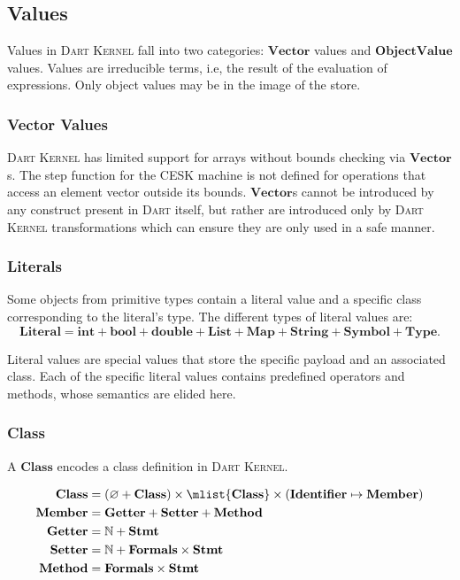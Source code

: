 \documentclass[a4paper,oneside,fleqn]{article}
\newcommand{\kernel}{\textsc{Dart Kernel}}
\newcommand{\dart}{\textsc{Dart}}
\renewcommand{\emptyset}{\varnothing}
\newcommand{\NN}{\mathbb{N}}    %
\newcommand{\dstmt}{\mathbf{Stmt}}
\newcommand{\dlit}{\mathbf{Literal}}
\newcommand{\dobjval}{\mathbf{ObjectValue}}
\newcommand{\dvector}{\mathbf{Vector}}
\newcommand{\dmember}{\mathbf{Member}}
\newcommand{\dident}{\mathbf{Identifier}}
\newcommand{\dtype}{\mathbf{Type}}
\newcommand{\dclass}{\mathbf{Class}}
\newcommand{\dformals}{\mathbf{Formals}}
\newcommand{\dsemint}{\mathbf{int}}
\newcommand{\dsembool}{\mathbf{bool}}
\newcommand{\dsemdouble}{\mathbf{double}}
\newcommand{\dsemlist}{\mathbf{List}}
\newcommand{\dsemmap}{\mathbf{Map}}
\newcommand{\dsemstring}{\mathbf{String}}
\newcommand{\dsemsymbol}{\mathbf{Symbol}}
\begin{document}
\subsection{Values}
\label{sec:values}

Values in \kernel{} fall into two categories: $\dvector$ values and $\dobjval$ values.
Values are irreducible terms, i.e, the result of the evaluation of expressions.
Only object values may be in the image of the store.

\subsubsection{Vector Values}
\label{subsubsec:vector-values}

\kernel{} has limited support for arrays without bounds checking via $\dvector$s.
The step function for the CESK machine is not defined for operations that access an element vector outside its bounds.
$\dvector$s cannot be introduced by any construct present in \dart{} itself, but rather are introduced only by \kernel{} transformations which can ensure they are only used in a safe manner.

\subsubsection{Literals}

Some objects from primitive types contain a literal value and a specific class corresponding to the literal's type.
The different types of literal values are:
\[\dlit = \dsemint + \dsembool + \dsemdouble + \dsemlist + \dsemmap + \dsemstring + \dsemsymbol + \dtype.\]

Literal values are special values that store the specific payload and an associated class.
Each of the specific literal values contains predefined operators and methods, whose semantics are elided here.

\subsubsection{Class}
\label{subsec:class}

A $\dclass$ encodes a class definition in \kernel{}.

\begin{align*}
\dclass &= (\emptyset + \dclass) \times \mlist{\dclass} \times (\dident \mapsto \dmember)\\
\dmember &= \mathbf{Getter} + \mathbf{Setter} + \mathbf{Method} \\
\mathbf{Getter} &= \NN + \dstmt \\
\mathbf{Setter} &= \NN + \dformals \times \dstmt \\
\mathbf{Method} &= \dformals \times \dstmt
\end{align*}
\end{document}
